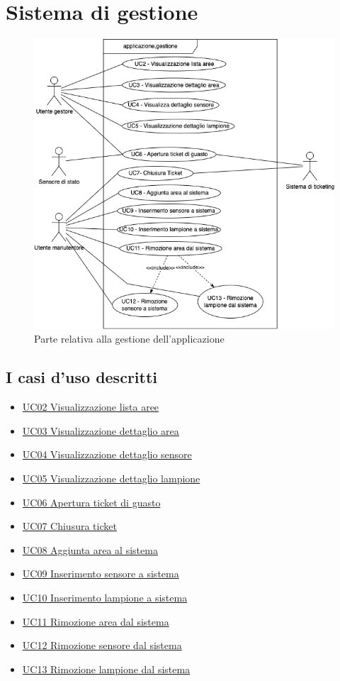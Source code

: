 
\section{Sistema di gestione}

\begin{figure}[H]
    \includegraphics[width=\textwidth]{contenuti/img/casi_uso_grafici-applicazione,gestione.png}
    \caption{Parte relativa alla gestione dell'applicazione}
    \label{fig:gestione}
\end{figure}

\subsection{I casi d'uso descritti}

\begin{itemize}
    \item \hyperref[uc:02]{UC02 Visualizzazione lista aree}
    \item \hyperref[uc:03]{UC03 Visualizzazione dettaglio area}
    \item \hyperref[uc:04]{UC04 Visualizzazione dettaglio sensore}
    \item \hyperref[uc:05]{UC05 Visualizzazione dettaglio lampione}
    \item \hyperref[uc:06]{UC06 Apertura ticket di guasto}
    \item \hyperref[uc:07]{UC07 Chiusura ticket}
    \item \hyperref[uc:08]{UC08 Aggiunta area al sistema}
    \item \hyperref[uc:09]{UC09 Inserimento sensore a sistema}
    \item \hyperref[uc:10]{UC10 Inserimento lampione a sistema}
    \item \hyperref[uc:11]{UC11 Rimozione area dal sistema}
    \item \hyperref[uc:12]{UC12 Rimozione sensore dal sistema}
    \item \hyperref[uc:13]{UC13 Rimozione lampione dal sistema}
\end{itemize}
